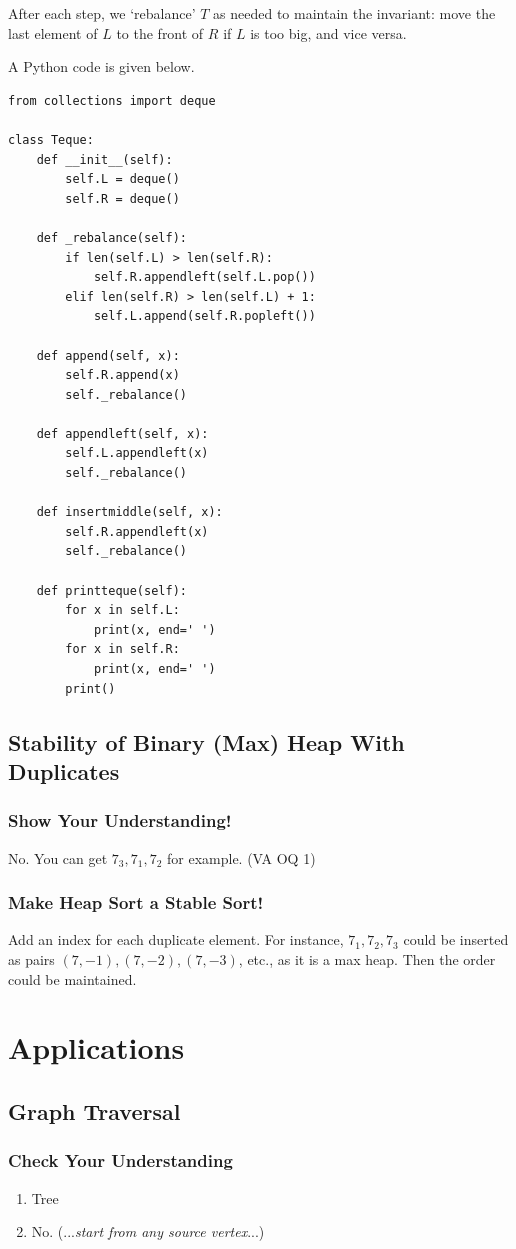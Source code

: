 \documentclass[12pt]{article}
\begin{document}
After each step, we `rebalance' $T$ as needed to maintain the invariant: move the last element of $L$ to the front of $R$ if $L$ is too big, and vice versa.

A Python code is given below.
\begin{verbatim}
from collections import deque

class Teque:
    def __init__(self):
        self.L = deque()
        self.R = deque()

    def _rebalance(self):
        if len(self.L) > len(self.R):
            self.R.appendleft(self.L.pop())
        elif len(self.R) > len(self.L) + 1:
            self.L.append(self.R.popleft())

    def append(self, x):
        self.R.append(x)
        self._rebalance()

    def appendleft(self, x):
        self.L.appendleft(x)
        self._rebalance()

    def insertmiddle(self, x):
        self.R.appendleft(x)
        self._rebalance()

    def printteque(self):
        for x in self.L:
            print(x, end=' ')
        for x in self.R:
            print(x, end=' ')
        print()
\end{verbatim}
\subsection{Stability of Binary (Max) Heap With Duplicates}
\subsubsection{Show Your Understanding!}
No. You can get $7_3,7_1,7_2$ for example. (VA OQ 1)
\subsubsection{Make Heap Sort a Stable Sort!}
Add an index for each duplicate element. For instance, $7_1,7_2,7_3$ could be inserted as pairs $(7,-1),(7,-2),(7,-3)$, etc., as it is a max heap. Then the order could be maintained.
\section{Applications}
\subsection{Graph Traversal}
\subsubsection{Check Your Understanding}
\begin{enumerate}
\item Tree
\item No. (...\textit{start from any source vertex}...)
\end{enumerate}
\end{document}
